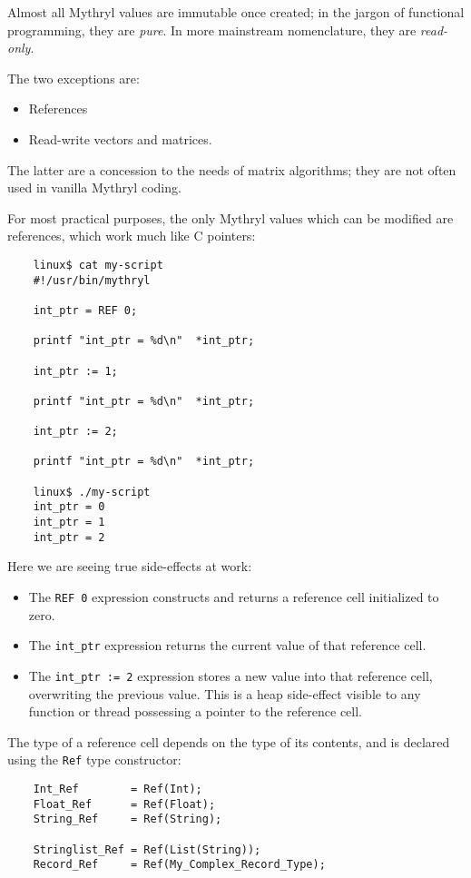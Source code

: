 Almost all Mythryl values are immutable once created;  in 
the jargon of functional programming, they are {\it pure}. 
In more mainstream nomenclature, they are {\it read-only}.

The two exceptions are:
\begin{itemize}
\item References
\item Read-write vectors and matrices.
\end{itemize}

The latter are a concession to the needs of matrix algorithms; 
they are not often used  in vanilla Mythryl coding.

For most practical purposes, the only Mythryl values which 
can be modified are references, which work much like C pointers:

\begin{verbatim}
    linux$ cat my-script
    #!/usr/bin/mythryl

    int_ptr = REF 0;

    printf "int_ptr = %d\n"  *int_ptr;

    int_ptr := 1;

    printf "int_ptr = %d\n"  *int_ptr;

    int_ptr := 2;

    printf "int_ptr = %d\n"  *int_ptr;

    linux$ ./my-script
    int_ptr = 0
    int_ptr = 1
    int_ptr = 2
\end{verbatim}

Here we are seeing true side-effects at work:

\begin{itemize}
\item The {\tt REF 0} expression constructs and returns a reference 
      cell initialized to zero. 
\item The {\tt *int\_ptr} expression returns the current value of that 
      reference cell. 
\item The {\tt int\_ptr := 2} expression stores a new value into that 
      reference cell, overwriting the previous value.  This is a 
      heap side-effect visible to any function or thread possessing 
      a pointer to the reference cell. 
\end{itemize}

The type of a reference cell depends on the type of its contents, 
and is declared using the {\tt Ref} type constructor:

\begin{verbatim}
    Int_Ref        = Ref(Int);
    Float_Ref      = Ref(Float);
    String_Ref     = Ref(String);

    Stringlist_Ref = Ref(List(String));
    Record_Ref     = Ref(My_Complex_Record_Type);
\end{verbatim}

